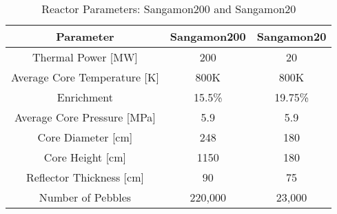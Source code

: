 \begin{table}[h!]
\centering
\begin{tabular}{ c  c  c }
\hline
Parameter & Sangamon200 & Sangamon20 \\
\hline
Thermal Power [MW] & 200 & 20 \\
Average Core Temperature [K] & 800K & 800K \\
Enrichment & 15.5\% & 19.75\% \\
Average Core Pressure [MPa] & 5.9 & 5.9 \\
Core Diameter [cm] & 248 & 180 \\
Core Height [cm] & 1150 & 180 \\
Reflector Thickness [cm] & 90 & 75 \\
Number of Pebbles & 220,000 & 23,000 \\
\hline
\end{tabular}
\caption{Reactor Parameters: Sangamon200 and Sangamon20}
\label{table:params1}
\end{table}